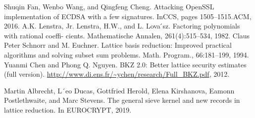 \documentclass[sigconf]{acmart}
\begin{document}
\begin{thebibliography}{21}

Shuqin Fan, Wenbo Wang, and Qingfeng Cheng. Attacking OpenSSL implementation of ECDSA with a few signatures. InCCS, pages 1505–1515.ACM, 2016.
A.K. Lenstra, Jr. Lenstra, H.W., and L. Lova ́sz. Factoring polynomials with rational coeffi- cients. Mathematische Annalen, 261(4):515–534, 1982.
Claus Peter Schnorr and M. Euchner. Lattice basis reduction: Improved practical algorithms and solving subset sum problems. Math. Program., 66:181–199, 1994.
Yuanmi Chen and Phong Q. Nguyen. BKZ 2.0: Better lattice security estimates (full version). {\url{http://www.di.ens.fr/~ychen/research/Full_BKZ.pdf}}, 2012.

Martin Albrecht, L´eo Ducas, Gottfried Herold, Elena Kirshanova, Eamonn Postlethwaite, and Marc Stevens. The general sieve kernel and new records in lattice reduction. In EUROCRYPT, 2019.


\end{thebibliography}
\end{document}
